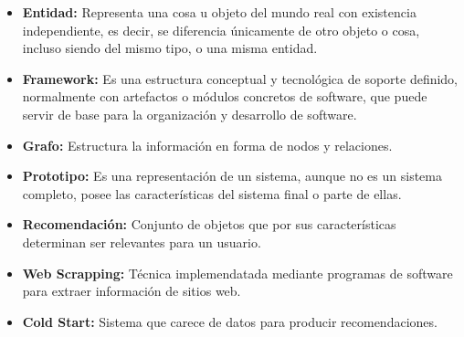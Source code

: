 \begin{itemize}
	\item \textbf{Entidad:} Representa una cosa u objeto del mundo real con existencia independiente, es decir, se diferencia únicamente de otro objeto o cosa, incluso siendo del mismo tipo, o una misma entidad.
	\item \textbf{Framework: }Es una estructura conceptual y tecnológica de soporte definido, normalmente con artefactos o módulos concretos de software, que puede servir de base para la organización y desarrollo de software. 
	\item \textbf{Grafo:} Estructura la información en forma de nodos y relaciones.
	\item \textbf{Prototipo:} Es una representación de un sistema, aunque no es un sistema completo, posee las características del sistema final o parte de ellas.
	\item \textbf{Recomendación:} Conjunto de objetos que por sus características determinan ser relevantes para un usuario. 
	\item \textbf{Web Scrapping:} Técnica implemendatada mediante programas de software para extraer información de sitios web.
	\item \textbf{Cold Start:} Sistema que carece de datos para producir recomendaciones.
\end{itemize}
